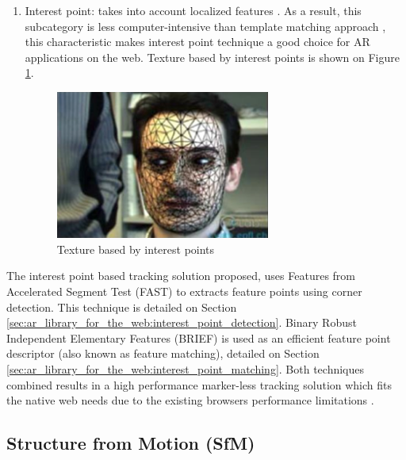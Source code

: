 \begin{enumerate}
\begin{enumerate}
      \item Interest point: takes into account localized features \cite{Teichrieb2007}. As a result, this subcategory is less computer-intensive than template matching approach \cite{Teichrieb2007,RostenFaster2010}, this characteristic makes interest point technique a good choice for AR applications on the web. Texture based by interest points is shown on Figure \ref{figure:keypoints}.

        \begin{figure}[!htb]
          \centering
          \includegraphics[width=200pt]{chapters/basic_concepts/keypoints.png}
          \caption{Texture based by interest points}
          \label{figure:keypoints}
        \end{figure}
    \end{enumerate}

\end{enumerate}

The interest point based tracking solution proposed, uses Features from Accelerated Segment Test (FAST) \cite{Rosten2010} to extracts feature points using corner detection. This technique is detailed on Section \ref{sec:ar_library_for_the_web:interest_point_detection}. Binary Robust Independent Elementary Features (BRIEF) \cite{Calonder2010} is used as an efficient feature point descriptor (also known as feature matching), detailed on Section \ref{sec:ar_library_for_the_web:interest_point_matching}. Both techniques combined results in a high performance marker-less tracking solution which fits the native web needs due to the existing browsers performance limitations \cite{Calonder2010,RostenFaster2010}.


\subsection{Structure from Motion (SfM)} %
\label{sub:basic_concepts:markerless_tracking_technique:sfm}

